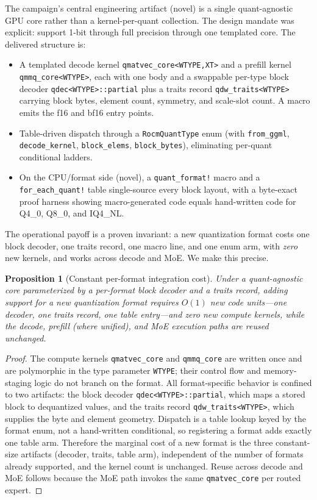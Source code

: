 \documentclass[11pt]{article}
\newtheorem{proposition}{Proposition}
\begin{document}
The campaign's central engineering artifact (novel) is a single quant-agnostic GPU core rather than a kernel-per-quant collection. The design mandate was explicit: support 1-bit through full precision through one templated core. The delivered structure is:

\begin{itemize}
\item A templated decode kernel \texttt{qmatvec\_core<WTYPE,XT>} and a prefill kernel \texttt{qmmq\_core<WTYPE>}, each with one body and a swappable per-type block decoder \texttt{qdec<WTYPE>::partial} plus a traits record \texttt{qdw\_traits<WTYPE>} carrying block bytes, element count, symmetry, and scale-slot count. A macro emits the f16 and bf16 entry points.
\item Table-driven dispatch through a \texttt{RocmQuantType} enum (with \texttt{from\_ggml}, \texttt{decode\_kernel}, \texttt{block\_elems}, \texttt{block\_bytes}), eliminating per-quant conditional ladders.
\item On the CPU/format side (novel), a \texttt{quant\_format!} macro and a \texttt{for\_each\_quant!} table single-source every block layout, with a byte-exact proof harness showing macro-generated code equals hand-written code for Q4\_0, Q8\_0, and IQ4\_NL.
\end{itemize}

The operational payoff is a proven invariant: a new quantization format costs one block decoder, one traits record, one macro line, and one enum arm, with \emph{zero} new kernels, and works across decode and MoE. We make this precise.

\begin{proposition}[Constant per-format integration cost]
\label{prop:onecore}
Under a quant-agnostic core parameterized by a per-format block decoder and a traits record, adding support for a new quantization format requires $O(1)$ new code units---one decoder, one traits record, one table entry---and zero new compute kernels, while the decode, prefill (where unified), and MoE execution paths are reused unchanged.
\end{proposition}

\begin{proof}
The compute kernels \texttt{qmatvec\_core} and \texttt{qmmq\_core} are written once and are polymorphic in the type parameter \texttt{WTYPE}; their control flow and memory-staging logic do not branch on the format. All format-specific behavior is confined to two artifacts: the block decoder \texttt{qdec<WTYPE>::partial}, which maps a stored block to dequantized values, and the traits record \texttt{qdw\_traits<WTYPE>}, which supplies the byte and element geometry. Dispatch is a table lookup keyed by the format enum, not a hand-written conditional, so registering a format adds exactly one table arm. Therefore the marginal cost of a new format is the three constant-size artifacts (decoder, traits, table arm), independent of the number of formats already supported, and the kernel count is unchanged. Reuse across decode and MoE follows because the MoE path invokes the same \texttt{qmatvec\_core} per routed expert.
\end{proof}
\end{document}
